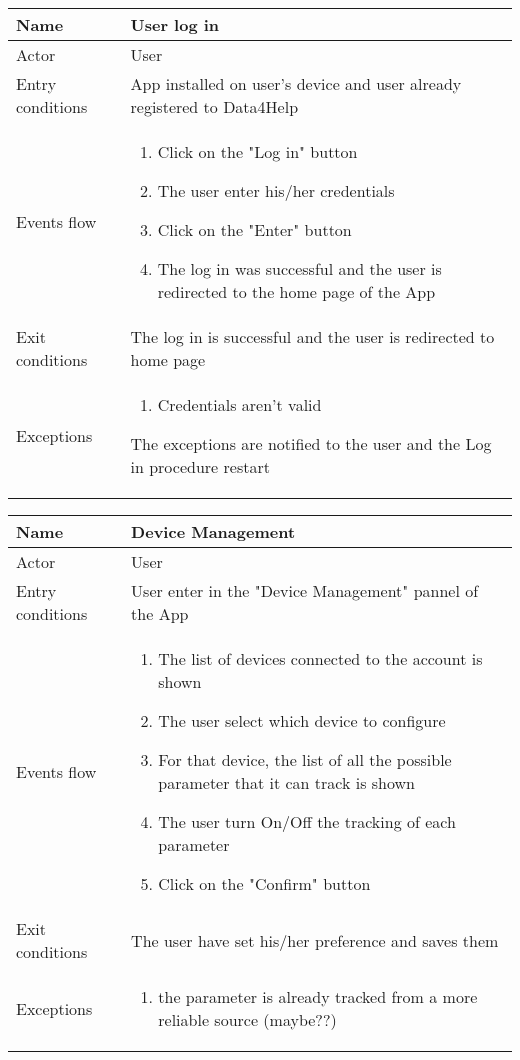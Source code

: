 \begin{table}[]
\begin{tabular}{|l|p{12cm}|}
\hline
Name             & User log in \\ \hline
Actor            & User \\ \hline
Entry conditions & App installed on user's device and user already registered to Data4Help \\ \hline
Events flow      & \begin{enumerate}
\item Click on the "Log in" button
\item The user enter his/her credentials
\item Click on the "Enter" button
\item The log in was successful and the user is redirected to the home page of the App
\end{enumerate} \\ \hline
Exit conditions  & The log in is successful and the user is redirected to home page \\ \hline
Exceptions       & \begin{enumerate}
\item Credentials aren't valid
\end{enumerate} The exceptions are notified to the user and the Log in procedure restart \\ \hline
\end{tabular}
\end{table}

\begin{table}[]
\begin{tabular}{|l|p{12cm}|}
\hline
Name             & Device Management \\ \hline
Actor            & User \\ \hline
Entry conditions & User enter in the "Device Management" pannel of the App \\ \hline
Events flow      & \begin{enumerate}
\item The list of devices connected to the account is shown
\item The user select which device to configure
\item For that device, the list of all the possible parameter that it can track is shown
\item The user turn On/Off the tracking of each parameter
\item Click on the "Confirm" button
\end{enumerate} \\ \hline
Exit conditions  & The user have set his/her preference and saves them \\ \hline
Exceptions       & \begin{enumerate}
\item the parameter is already tracked from a more reliable source (maybe??)
\end{enumerate} \\ \hline
\end{tabular}
\end{table}

